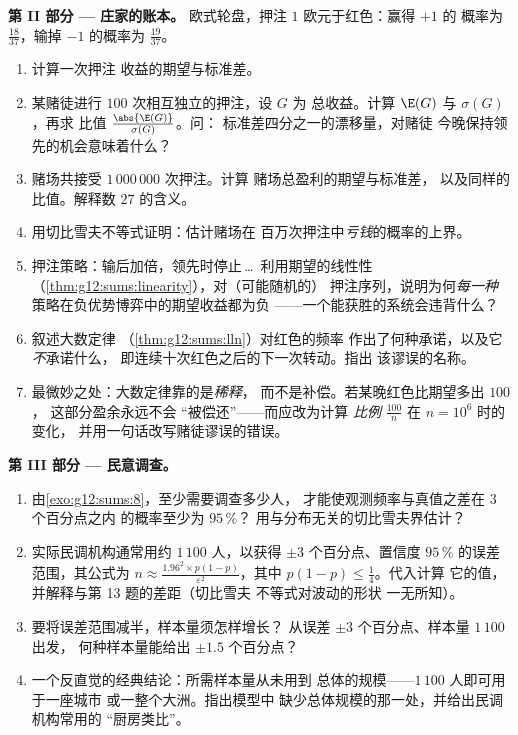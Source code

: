 \begin{problem}
\medskip
\noindent\textbf{第 II 部分 --- 庄家的账本。}
欧式轮盘，押注 $1$ 欧元于红色：赢得 $+1$ 的
概率为 $\frac{18}{37}$，输掉 $-1$ 的概率为
$\frac{19}{37}$。
\begin{enumerate}[resume]
  \item 计算一次押注
        收益的期望与标准差。
  \item 某赌徒进行 $100$ 次相互独立的押注，设 $G$ 为
        总收益。计算 $\E(G)$ 与 $\sigma(G)$，再求
        比值 $\frac{\abs{\E(G)}}{\sigma(G)}$。问：
        标准差四分之一的漂移量，对赌徒
        今晚保持领先的机会意味着什么？
  \item 赌场共接受 $1\,000\,000$ 次押注。计算
        赌场总盈利的期望与标准差，
        以及同样的比值。解释数 $27$ 的含义。
  \item 用切比雪夫不等式证明：估计赌场在
        百万次押注中\emph{亏钱}的概率的上界。
  \item 押注策略：输后加倍，领先时停止\,\dots\
        利用期望的线性性
        （\cref{thm:g12:sums:linearity}），对（可能随机的）
        押注序列，说明为何\emph{每一种}
        策略在负优势博弈中的期望收益都为负
        ——一个能获胜的系统会违背什么？
  \item 叙述大数定律
        （\cref{thm:g12:sums:lln}）对红色的频率
        作出了何种承诺，以及它\emph{不}承诺什么，
        即连续十次红色之后的下一次转动。指出
        该谬误的名称。
  \item 最微妙之处：大数定律靠的是\emph{稀释}，
        而不是补偿。若某晚红色比期望多出 $100$，
        这部分盈余永远不会
        “被偿还”——而应改为计算
        \emph{比例} $\frac{100}{n}$ 在 $n = 10^6$ 时的变化，
        并用一句话改写赌徒谬误的错误。
\end{enumerate}

\medskip
\noindent\textbf{第 III 部分 --- 民意调查。}
\begin{enumerate}[resume]
  \item 由\cref{exo:g12:sums:8}，至少需要调查多少人，
        才能使观测频率与真值之差在 $3$ 个百分点之内
        的概率至少为 $95\,\%$？
        用与分布无关的切比雪夫界估计？
  \item 实际民调机构通常用约 $1\,100$ 人，以获得
        $\pm 3$ 个百分点、置信度 $95\,\%$ 的误差范围，其公式为
        $n \approx \frac{1.96^2 \times p(1-p)}
        {\varepsilon^2}$，其中 $p(1-p) \leq \frac14$。代入计算
        它的值，并解释与第 13 题的差距（切比雪夫
        不等式对波动的形状
        一无所知）。
  \item 要将误差范围减半，样本量须怎样增长？
        从误差 $\pm 3$ 个百分点、样本量 $1\,100$ 出发，
        何种样本量能给出 $\pm 1.5$ 个百分点？
  \item 一个反直觉的经典结论：所需样本量从未用到
        总体的规模——$1\,100$ 人即可用于一座城市
        或一整个大洲。指出模型中
        缺少总体规模的那一处，并给出民调机构常用的
        “厨房类比”。
\end{enumerate}


\end{problem}
